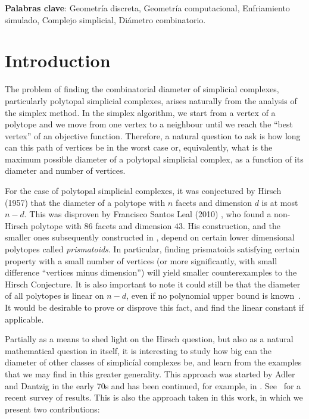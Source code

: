 \documentclass[12pt,a4paper]{article}
\theoremstyle{plain}
\theoremstyle{definition}
\begin{document}
\textbf{Palabras clave}: Geometría discreta, Geometría computacional, Enfriamiento simulado, Complejo simplicial, Diámetro combinatorio.
\newpage

\tableofcontents
\clearpage
\vspace*{\fill}
\clearpage
\setcounter{page}{1}

\section{Introduction}
The problem of finding the combinatorial diameter of simplicial complexes, particularly polytopal simplicial complexes, arises naturally from the analysis of the simplex method. In the simplex algorithm, we start from a vertex of a polytope and we move from one vertex to a neighbour until we reach the ``best vertex'' of an objective function. Therefore, a natural question to ask is how long can this path of vertices be in the worst case or, equivalently, what is the maximum possible diameter of a polytopal simplicial complex, as a function of its diameter and number of vertices.

For the case of polytopal simplicial complexes, it was conjectured by Hirsch (1957) that the diameter of a polytope with $n$ facets and dimension $d$ is at most $n-d$. This was disproven by Francisco Santos Leal (2010) \cite{counterexample}, who found a non-Hirsch polytope with $86$ facets and dimension $43$. His construction, and the smaller ones subsequently constructed in \cite{improvement}, depend on certain lower dimensional polytopes called \emph{prismatoids}. In particular, finding prismatoids satisfying certain property with a small number of vertices (or more significantly, with small difference ``vertices minus dimension'') will yield smaller counterexamples to the Hirsch Conjecture. It is also important to note it could still be that the diameter of all polytopes is linear on $n-d$, even if no polynomial upper bound is known~\cite{Kalai:polymath3}. It would be desirable to prove or disprove this fact, and find the linear constant if applicable. 

Partially as a means to shed light on the Hirsch question, but also as a natural mathematical question in itself, it is interesting to study how big can the diameter of other classes of simplicíal complexes be, and learn from the examples that we may find in this greater generality. This approach was started by Adler and Dantzig in the early 70s and has been continued, for example, in \cite{ManiWalkup,nonPolytopal}. See~\cite{Santos:progress} for a recent survey of results. This is also the approach taken in this work, in which we present two contributions:
\end{document}
